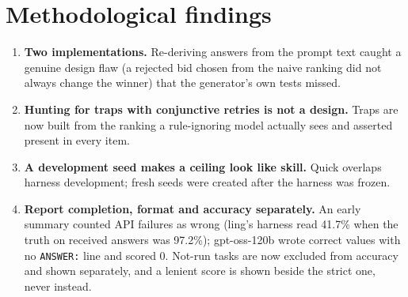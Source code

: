 \documentclass[11pt]{article}
\begin{document}
\section{Methodological findings}\label{sec:method-findings}
\begin{enumerate}
\item \textbf{Two implementations.} Re-deriving answers from the prompt text caught a genuine design flaw (a rejected bid chosen from the naive ranking did not always change the winner) that the generator's own tests missed.
\item \textbf{Hunting for traps with conjunctive retries is not a design.} Traps are now built from the ranking a rule-ignoring model actually sees and asserted present in every item.
\item \textbf{A development seed makes a ceiling look like skill.} Quick overlaps harness development; fresh seeds were created after the harness was frozen.
\item \textbf{Report completion, format and accuracy separately.} An early summary counted API failures as wrong (ling's harness read 41.7\% when the truth on received answers was 97.2\%); gpt-oss-120b wrote correct values with no \texttt{ANSWER:} line and scored 0. Not-run tasks are now excluded from accuracy and shown separately, and a lenient score is shown beside the strict one, never instead.
\end{enumerate}
\end{document}
